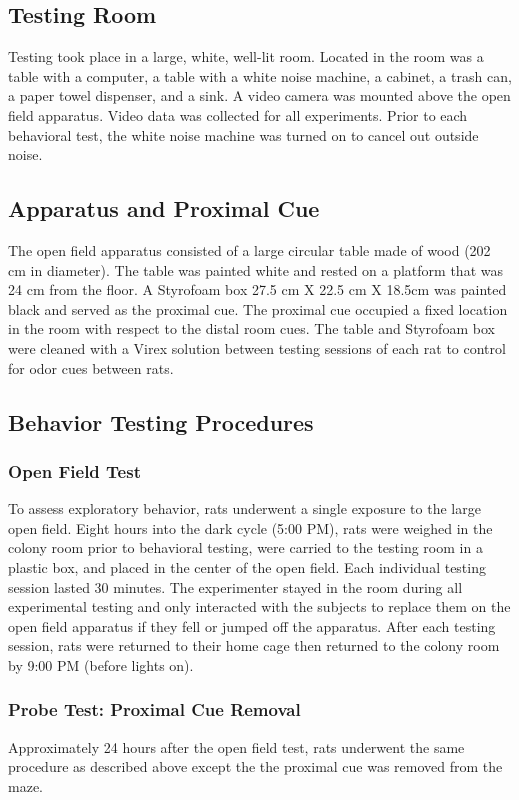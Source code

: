 \documentclass[fleqn,10pt]{wlscirep}
\begin{document}
\subsection*{Testing Room}
Testing took place in a large, white, well-lit room. Located in the room was a table with a computer, a table with a white noise machine, a cabinet, a trash can, a paper towel dispenser, and a sink. A video camera was mounted above the open field apparatus. Video data was collected for all experiments. Prior to each behavioral test, the white noise machine was turned on to cancel out outside noise.

\subsection*{Apparatus and Proximal Cue}
The open field apparatus consisted of a large circular table made of wood (202 cm in diameter). The table was painted white and rested on a platform that was 24 cm from the floor. A Styrofoam box 27.5 cm X 22.5 cm X 18.5cm was painted black and served as the proximal cue. The proximal cue occupied a fixed location in the room with respect to the distal room cues. The table and Styrofoam box were cleaned with a Virex solution between testing sessions of each rat to control for odor cues between rats. 

\subsection*{Behavior Testing Procedures}

\subsubsection*{Open Field Test} To assess exploratory behavior, rats underwent a single exposure to the large open field. Eight hours into the dark cycle (5:00 PM), rats were weighed in the colony room prior to behavioral testing, were carried to the testing room in a plastic box, and placed in the center of the open field. Each individual testing session lasted 30 minutes. The experimenter stayed in the room during all experimental testing and only interacted with the subjects to replace them on the open field apparatus if they fell or jumped off the apparatus. After each testing session, rats were returned to their home cage then returned to the colony room by 9:00 PM (before lights on).

\subsubsection*{Probe Test: Proximal Cue Removal} Approximately 24 hours after the open field test, rats underwent the same procedure as described above except the the proximal cue was removed from the maze.  
\end{document}
